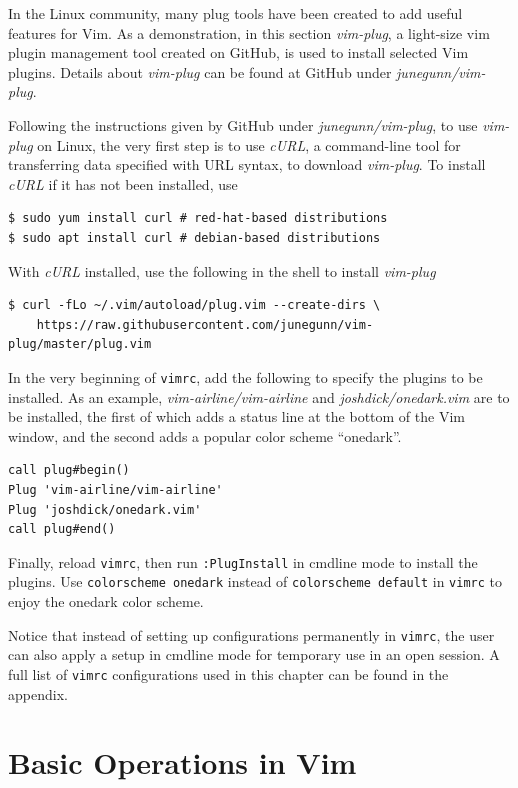 In the Linux community, many plug tools have been created to add useful features for Vim. As a demonstration, in this section \textit{vim-plug}, a light-size vim plugin management tool created on GitHub, is used to install selected Vim plugins. Details about \textit{vim-plug} can be found at GitHub under \textit{junegunn/vim-plug}.

Following the instructions given by GitHub under \textit{junegunn/vim-plug}, to use \textit{vim-plug} on Linux, the very first step is to use \textit{cURL}, a command-line tool for transferring data specified with URL syntax, to download \textit{vim-plug}. To install \textit{cURL} if it has not been installed, use
\begin{lstlisting}
$ sudo yum install curl # red-hat-based distributions
$ sudo apt install curl # debian-based distributions
\end{lstlisting}

With \textit{cURL} installed, use the following in the shell to install \textit{vim-plug}
\begin{lstlisting}
$ curl -fLo ~/.vim/autoload/plug.vim --create-dirs \
    https://raw.githubusercontent.com/junegunn/vim-plug/master/plug.vim
\end{lstlisting}
In the very beginning of \verb|vimrc|, add the following to specify the plugins to be installed. As an example, \textit{vim-airline/vim-airline} and \textit{joshdick/onedark.vim} are to be installed, the first of which adds a status line at the bottom of the Vim window, and the second adds a popular color scheme ``onedark''.
\begin{lstlisting}
call plug#begin()
Plug 'vim-airline/vim-airline'
Plug 'joshdick/onedark.vim'
call plug#end()
\end{lstlisting}
Finally, reload \verb|vimrc|, then run \verb|:PlugInstall| in cmdline mode to install the plugins. Use \verb|colorscheme onedark| instead of \verb|colorscheme default| in \verb|vimrc| to enjoy the onedark color scheme.

Notice that instead of setting up configurations permanently in \verb|vimrc|, the user can also apply a setup in cmdline mode for temporary use in an open session. A full list of \verb|vimrc| configurations used in this chapter can be found in the appendix.

\section{Basic Operations in Vim}

